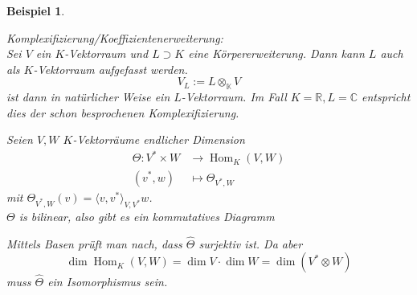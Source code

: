 \documentclass[12pt,a4paper]{article}
\newtheorem*{example}{Beispiel}
\theoremstyle{definition}
\theoremstyle{remark}
\renewcommand{\hat}[1]{\widehat{#1}}
\DeclareMathOperator{\Hom}{Hom}
\begin{document}
		\begin{example}
			\begin{proofenum}
				\item
					Komplexifizierung/Koeffizientenerweiterung: \\
					Sei $V$ ein $K$-Vektorraum und $L \supset K$ eine Körpererweiterung. Dann kann $L$ auch als $K$-Vektorraum aufgefasst werden.
					\begin{equation}
						V_L := L \otimes_{\mathbb{K}} V
					\end{equation}
					ist dann in natürlicher Weise ein $L$-Vektorraum. Im Fall $K = \mathbb{R}, L = \mathbb{C}$ entspricht dies der schon besprochenen Komplexifizierung. 
				\item 
					Seien $V,W$ $K$-Vektorräume endlicher Dimension
					\begin{equation}
						\begin{split}
							\Theta: V^* \times W &\rightarrow \Hom_{K}(V,W) \\
							(v^*,w) &\mapsto \Theta_{V^*,W}
						\end{split}
					\end{equation}
					mit $\Theta_{V^*,W}(v)=\langle v, v^* \rangle_{V,V^*}w$. \\
					$\Theta$ is bilinear, also gibt es ein kommutatives Diagramm
					\begin{center}
					\end{center}
					Mittels Basen prüft man nach, dass $\hat{\Theta}$ surjektiv ist. Da aber 
					\begin{equation}
						\dim \Hom_{K}(V,W) = \dim V \cdot \dim W = \dim (V^* \otimes W)
					\end{equation}
					muss $\hat{\Theta}$ ein Isomorphismus sein.
			\end{proofenum}
		\end{example}
\end{document}
